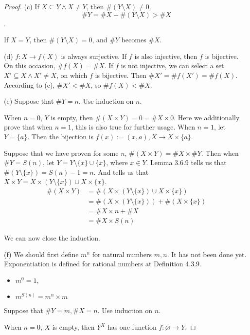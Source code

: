 \begin{proof}
(c)
If $X \subseteq Y \wedge X \neq Y$, then $\#(Y \setminus X) \neq 0$. 
\[
\#Y = \#X + \#(Y \setminus X) > \#X
\].

If $X = Y$, then $\#(Y \setminus X) = 0$, and $\#Y$ becomes $\#X$.

(d)
$f: X \rightarrow f(X)$ is always surjective. If $f$ is also injective, then $f$ is bijective. On this 
occasion, $\#f(X) = \#X$. If $f$ is not injective, we can select a set $X' \subseteq X \wedge X' \neq X$, 
on which $f$ is bijective. Then $\#X' = \#f(X') = \#f(X)$. According to (c), $\#X' < \#X$, so 
$\#f(X) < \#X$.

(e)
Suppose that $\#Y = n$. Use induction on $n$. 

When $n=0$, $Y$ is empty, then $\#(X \times Y) = 0 = \#X \times 0$. Here we additionally prove that 
when $n=1$, this is also true for further usage. When $n=1$, let $Y = \{a\}$. Then the bijection is 
$f(x):=(x,a), X \rightarrow X \times \{a\}$.

Suppose that we have proven for some $n$, $\#(X \times Y) = \#X \times \#Y$. Then when $\#Y = S(n)$, 
let $Y = Y\setminus\{x\}\cup\{x\}$, where $x \in Y$. Lemma 3.6.9 tells us that 
$\#(Y\setminus\{x\}) = S(n)-1 = n$. And  tells us that 
$X \times Y = X \times (Y\setminus\{x\}) \cup X \times \{x\}$. 
\begin{align*}
\#(X \times Y) 
&= \#(X \times (Y\setminus\{x\}) \cup X \times \{x\}) \\
&= \#(X \times (Y\setminus\{x\})) + \#(X \times \{x\}) \\
&= \#X \times n + \#X \\
&= \#X \times S(n)
\end{align*}

We can now close the induction.

(f)
We should first define $m^n$ for natural numbers $m,n$. It has not been done yet. Exponentiation is 
defined for rational numbers at Definition 4.3.9.
\begin{defn}
\begin{itemize}
\item $m^0=1$,
\item $m^{S(n)} = m^n \times m$
\end{itemize}
\end{defn}

Suppose that $\#Y = m,\#X = n$. Use induction on $n$. 

When $n=0$, $X$ is empty, then $Y^X$ has one function $f:\varnothing \rightarrow Y$.


\end{proof}
